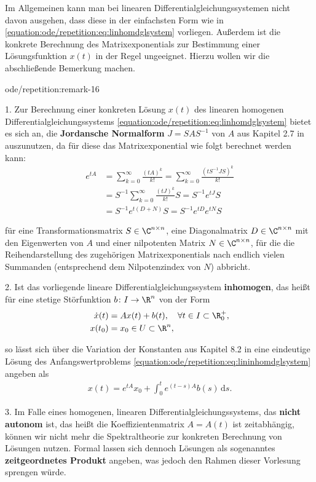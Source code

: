 \documentclass[letterpaper,10pt,english]{jupyterBook}
\begin{document}
\par
Im Allgemeinen kann man bei linearen Differentialgleichungssystemen nicht davon ausgehen, dass diese in der einfachsten Form wie in \eqref{equation:ode/repetition:eq:linhomdglsystem} vorliegen.
Außerdem ist die konkrete Berechnung des Matrixexponentials zur Bestimmung einer Lösungsfunktion \(x(t)\) in der Regel ungeeignet.
Hierzu wollen wir die abschließende Bemerkung machen.
\begin{remark}{}{ode/repetition:remark-16}



\par
1. Zur Berechnung einer konkreten Lösung \(x(t)\) des linearen homogenen Differentialgleichungssystems \eqref{equation:ode/repetition:eq:linhomdglsystem} bietet es sich an, die \textbf{Jordansche Normalform} \(J = SAS^{-1}\) von \(A\) aus Kapitel 2.7 in \cite{Ten21} auszunutzen, da für diese das Matrixexponential wie folgt berechnet werden kann:
\begin{align*}
e^{tA} &=  \sum_{k=0}^\infty \frac{(t A)^k}{k!} = \sum_{k=0}^\infty \frac{(tS^{-1}JS)^k}{k!} 
\\&= 
S^{-1} \sum_{k=0}^\infty \frac{(tJ)^k}{k!} S = S^{-1} e^{tJ}S 
\\&= S^{-1} e^{t(D+N)}S = S^{-1} e^{tD} e^{tN} S
\end{align*}
\par
für eine Transformationsmatrix \(S \in \C^{n \times n}\), eine Diagonalmatrix \(D \in \C^{n \times n}\) mit den Eigenwerten von \(A\) und einer nilpotenten Matrix \(N \in \C^{n \times n}\), für die die Reihendarstellung des zugehörigen Matrixexponentials nach endlich vielen Summanden (entsprechend dem Nilpotenzindex von \(N\)) abbricht.

\par
2. Ist das vorliegende lineare Differentialgleichungssystem \textbf{inhomogen}, das heißt für eine stetige Störfunktion \(b \colon I \rightarrow \R^n\) von der Form
\begin{align}\label{equation:ode/repetition:eq:lininhomdglsystem}
\dot{x}(t) &= A x(t) + b(t), \quad \forall t \in I \subset \R^+_0, \\
x(t_0) &= x_0 \in U \subset \R^n,
\end{align}
\par
so lässt sich über die Variation der Konstanten aus Kapitel 8.2 in \cite{Ten21} eine eindeutige Lösung des Anfangswertproblems \eqref{equation:ode/repetition:eq:lininhomdglsystem} angeben als
\begin{align*}
x(t) = e^{tA}x_0 + \int_0^t e^{(t-s)A}b(s) \, \mathrm{d}s.
\end{align*}
\par
3. Im Falle eines homogenen, linearen Differentialgleichungssystems, das \textbf{nicht autonom} ist, das heißt die Koeffizientenmatrix \(A = A(t)\) ist zeitabhängig, können wir nicht mehr die Spektraltheorie zur konkreten Berechnung von Lösungen nutzen.
Formal lassen sich dennoch Lösungen als sogenanntes \textbf{zeitgeordnetes Produkt} angeben, was jedoch den Rahmen dieser Vorlesung sprengen würde.
\end{remark}
\end{document}

